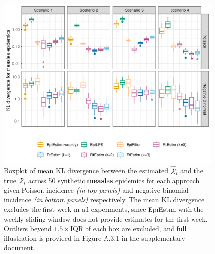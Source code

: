 \documentclass[10pt,letterpaper]{article}
\def\calR{\mathcal{R}}
\renewcommand{\hat}{\widehat}
\begin{document}
\begin{figure}[!ht]
  \centering
  \includegraphics[width=.99\textwidth]{fig/fig_kl_week_measles.png}
  \caption{Boxplot of mean KL divergence between the estimated 
  $\hat{\calR}_t$ and the true $\calR_t$ across 50 synthetic \textbf{measles} epidemics for 
  each approach given Poisson incidence \textit{(in top panels)} and negative 
  binomial incidence \textit{(in bottom panels)} respectively. 
  The mean KL divergence excludes the first week in all experiments, since EpiEstim 
  with the weekly sliding window does not provide estimates for the first week.
  Outliers beyond $1.5\times$IQR of each box are excluded, and full illustration is 
  provided in Figure A.3.1 in the supplementary document.} 
  \label{fig:kl-res-measles}
\end{figure}
\end{document}
